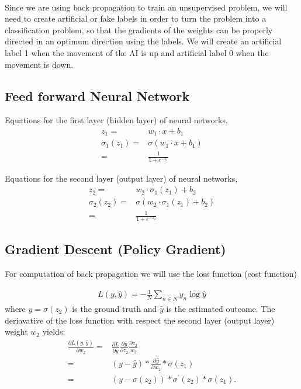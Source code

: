 \documentclass[12pt,a4paper]{article}
\begin{document}
\\
\noindent Since we are using back propagation to train an unsupervised problem, we will need to create artificial or fake labels in order to turn the problem into a classification problem, so that the gradients of the weights can be properly directed in an optimum direction using the labels. We will create an artificial label 1 when the movement of the AI is up and artificial label 0 when the movement is down.
\subsection{Feed forward Neural Network}

\noindent Equations for the first layer (hidden layer) of neural networks,
\begin{align}
z_{1}=& w_1\cdot x+b_1\\
\sigma_{1}(z_1)=&\sigma(w_1\cdot x+b_1)\\
=& \frac{1}{1+e^{-z_1}}
\end{align}

\noindent Equations for the second layer (output layer) of neural networks,
\begin{align}
z_{2}=& w_2\cdot \sigma_1(z_1)+b_2\\
\sigma_{2}(z_2)=&\sigma(w_2\cdot \sigma_1(z_1)+b_2)\\
=& \frac{1}{1+e^{-z_2}}
\end{align}

\subsection{Gradient Descent (Policy Gradient)}

\noindent For computation of back propagation we will use the loss function (cost function)

\begin{align}
L(y,\hat{y}) =-\frac{1}{N}\sum_{n\in N}y_n\log\hat{y}
\end{align}
where $y=\sigma(z_2)$ is the ground truth and $\hat{y}$ is the estimated outcome. The deriavative of the loss function with respect the second layer (output layer) weight $w_2$ yields:
\begin{align}
\frac{\partial L(y,\hat{y})}{\partial w_2}=&\frac{\partial L}{\partial \hat{y}}\frac{\partial\hat{y}}{\partial z_2}\frac{\partial z_2}{w_2}\\
=&(y-\hat{y})*\frac{\partial\hat{y}}{\partial w_2}*\sigma(z_1)\\
=&(y-\sigma(z_2))*\sigma^\prime(z_2)*\sigma(z_1).
\end{align}
\end{document}
